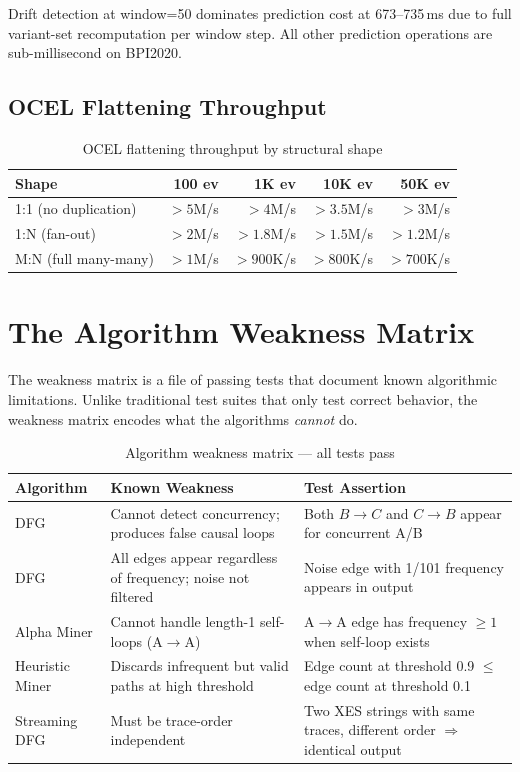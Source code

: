 \documentclass[12pt,a4paper]{article}
\begin{document}
Drift detection at window=50 dominates prediction cost at 673--735\,ms due to
full variant-set recomputation per window step. All other prediction operations
are sub-millisecond on BPI2020.

\subsection{OCEL Flattening Throughput}

\begin{table}[H]
  \centering
  \caption{OCEL flattening throughput by structural shape}
  \label{tab:ocel}
  \begin{tabular}{lrrrr}
    \toprule
    \textbf{Shape} & \textbf{100 ev} & \textbf{1K ev} & \textbf{10K ev} & \textbf{50K ev} \\
    \midrule
    1:1 (no duplication) & $>5$M/s & $>4$M/s & $>3.5$M/s & $>3$M/s \\
    1:N (fan-out)        & $>2$M/s & $>1.8$M/s & $>1.5$M/s & $>1.2$M/s \\
    M:N (full many-many) & $>1$M/s & $>900$K/s & $>800$K/s & $>700$K/s \\
    \bottomrule
  \end{tabular}
\end{table}

\section{The Algorithm Weakness Matrix}
\label{sec:weakness}

The weakness matrix is a file of passing tests that document known algorithmic
limitations. Unlike traditional test suites that only test correct behavior, the
weakness matrix encodes what the algorithms \emph{cannot} do.

\begin{table}[H]
  \centering
  \caption{Algorithm weakness matrix --- all tests pass}
  \label{tab:weakness}
  \begin{tabular}{lp{5.5cm}p{4cm}}
    \toprule
    \textbf{Algorithm} & \textbf{Known Weakness} & \textbf{Test Assertion} \\
    \midrule
    DFG & Cannot detect concurrency; produces false causal loops & Both $B\to C$ and $C\to B$ appear for concurrent A/B \\
    DFG & All edges appear regardless of frequency; noise not filtered & Noise edge with 1/101 frequency appears in output \\
    Alpha Miner & Cannot handle length-1 self-loops (A$\to$A) & A$\to$A edge has frequency $\ge 1$ when self-loop exists \\
    Heuristic Miner & Discards infrequent but valid paths at high threshold & Edge count at threshold 0.9 $\le$ edge count at threshold 0.1 \\
    Streaming DFG & Must be trace-order independent & Two XES strings with same traces, different order $\Rightarrow$ identical output \\
    \bottomrule
  \end{tabular}
\end{table}
\end{document}

